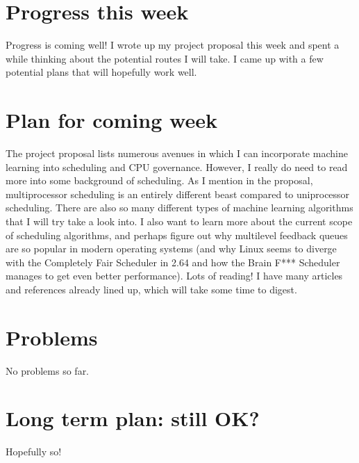 \documentclass[12pt]{article}
\def\ind{\hspace*{0.3in}}
\begin{document}
\setlength{\parindent}{0in}
\addtolength{\parskip}{0.1cm}
\setlength{\fboxrule}{.5mm}\setlength{\fboxsep}{1.2mm}
\newlength{\boxlength}\setlength{\boxlength}{\textwidth}
\addtolength{\boxlength}{-4mm}
\begin{center}
\end{center}
\vspace{2mm}

\section*{Progress this week}
\ind Progress is coming well! I wrote up my project proposal this week and spent a while thinking about the potential routes I will take. I came up with a few potential plans that will hopefully work well. 
\section*{Plan for coming week}
\ind The project proposal lists numerous avenues in which I can incorporate machine learning into scheduling and CPU governance. However, I really do need to read more into some background of scheduling. As I mention in the proposal, multiprocessor scheduling is an entirely different beast compared to uniprocessor scheduling. There are also so many different types of machine learning algorithms that I will try take a look into. I also want to learn more about the current scope of scheduling algorithms, and perhaps figure out why multilevel feedback queues are so popular in modern operating systems (and why Linux seems to diverge with the Completely Fair Scheduler in 2.64 and how the Brain F*** Scheduler manages to get even better performance). Lots of reading! I have many articles and references already lined up, which will take some time to digest.
\section*{Problems}
No problems so far.
\section*{Long term plan: still OK?}
Hopefully so! 
\end{document}
